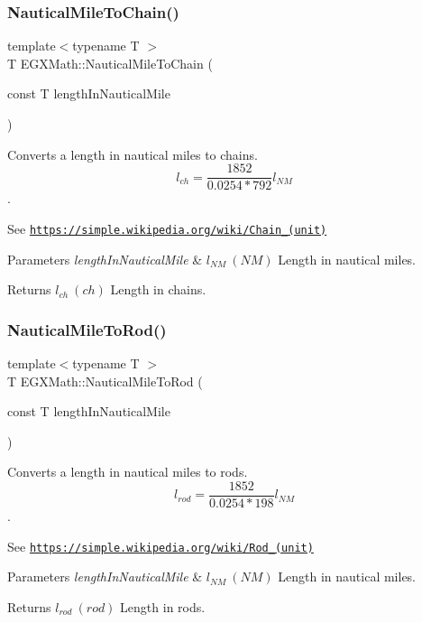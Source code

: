 \subsubsection{\texorpdfstring{Nautical\+Mile\+To\+Chain()}{NauticalMileToChain()}}
{\footnotesize\ttfamily template$<$typename T $>$ \\
T E\+G\+X\+Math\+::\+Nautical\+Mile\+To\+Chain (\begin{DoxyParamCaption}\item[{const T}]{length\+In\+Nautical\+Mile }\end{DoxyParamCaption})}



Converts a length in nautical miles to chains. \[ l_{ch}= \frac{1852}{0.0254 * 792} l_{NM} \]. 

See \href{https://simple.wikipedia.org/wiki/Chain_(unit)}{\tt https\+://simple.\+wikipedia.\+org/wiki/\+Chain\+\_\+(unit)} 
\begin{DoxyParams}{Parameters}
{\em length\+In\+Nautical\+Mile} & $ l_{NM}\ (NM)$ Length in nautical miles. \\
\hline
\end{DoxyParams}
\begin{DoxyReturn}{Returns}
$ l_{ch}\ (ch)$ Length in chains. 
\end{DoxyReturn}
\mbox{\label{group___e_g_x_math-_conversions-_length_conversions-_nautical-_nautical_mile-_surveyors_gafcc747668b6e7d9a786bd74dc9c95c50}} 
\subsubsection{\texorpdfstring{Nautical\+Mile\+To\+Rod()}{NauticalMileToRod()}}
{\footnotesize\ttfamily template$<$typename T $>$ \\
T E\+G\+X\+Math\+::\+Nautical\+Mile\+To\+Rod (\begin{DoxyParamCaption}\item[{const T}]{length\+In\+Nautical\+Mile }\end{DoxyParamCaption})}



Converts a length in nautical miles to rods. \[ l_{rod}= \frac{1852}{0.0254 * 198} l_{NM} \]. 

See \href{https://simple.wikipedia.org/wiki/Rod_(unit)}{\tt https\+://simple.\+wikipedia.\+org/wiki/\+Rod\+\_\+(unit)} 
\begin{DoxyParams}{Parameters}
{\em length\+In\+Nautical\+Mile} & $ l_{NM}\ (NM)$ Length in nautical miles. \\
\hline
\end{DoxyParams}
\begin{DoxyReturn}{Returns}
$ l_{rod}\ (rod)$ Length in rods. 
\end{DoxyReturn}
